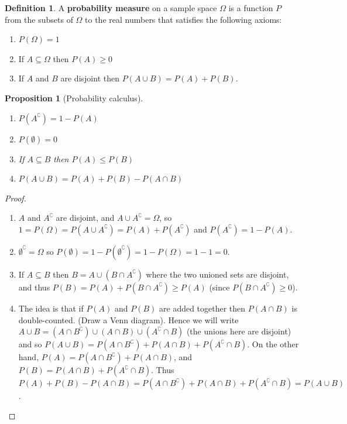 \documentclass[a4paper,leqno]{article}
\numberwithin{equation}{section}
\newtheorem{prp}[equation]{Proposition}
\theoremstyle{definition}
\newtheorem{defn}[equation]{Definition}
\theoremstyle{remark}
\newcommand{\df}{\textbf}
\newcommand{\union}{\cup}
\newcommand{\inter}{\cap}
\begin{document}
\begin{defn}\label{df:probmeasure}
  A \df{probability measure} on a sample space $ \Omega $ is a function $ P $ from the subsets of $ \Omega $ to the real numbers
  that satisfies the following axioms:
  \begin{enumerate}
    \item $ P(\Omega) = 1 $
    \item If $ A \subseteq \Omega $ then $ P(A) \geq 0 $
    \item If $ A $ and $ B $ are disjoint then $ P(A \union B) = P(A) + P(B) $.
  \end{enumerate}
\end{defn}

\begin{prp}[Probability calculus]\label{prp:probcalc}\leavevmode
  \begin{enumerate}
    \item $ P(A^\complement) = 1 - P(A) $
    \item $ P(\emptyset) = 0 $
    \item If $ A \subseteq B $ then $ P(A) \leq P(B) $
    \item $ P(A \union B) = P(A) + P(B) - P(A \inter B) $
  \end{enumerate}
\end{prp}
\begin{proof}\leavevmode
  \begin{enumerate}
    \item $ A $ and $ A^{\complement} $ are disjoint, and $ A \union A^{\complement} = \Omega $,
          so $ 1 = P(\Omega) = P(A \union A^{\complement}) = P(A) + P(A^{\complement}) $ and $ P(A^\complement) = 1 - P(A) $.
    \item $ \emptyset^\complement = \Omega $ so $ P(\emptyset) = 1 - P(\emptyset^\complement) = 1 - P(\Omega) = 1 - 1 = 0 $.
    \item If $ A \subseteq B $ then $ B = A \union (B \inter A^\complement) $ where the two unioned sets are disjoint, and
          thus $ P(B) = P(A) + P(B \inter A^\complement) \geq P(A) $ (since $ P(B \inter A^\complement) \geq 0 $).
    \item The idea is that if $ P(A) $ and $ P(B) $ are added together then $ P(A\inter B) $ is double-counted. (Draw a Venn diagram).
          Hence we will write $ A \union B = (A \inter B^\complement) \union (A \inter B) \union (A^\complement \inter B) $ (the unions
          here are disjoint) and so $ P(A \union B) = P(A \inter B^\complement) + P(A \inter B) + P(A^\complement \inter B) $. On the
          other hand, $ P(A) = P(A \inter B^\complement) + P(A \inter B) $, and $ P(B) = P(A \inter B) + P(A^\complement \inter B) $.
          Thus $ P(A) + P(B) - P(A \inter B) = P(A \inter B^\complement) + P(A \inter B) + P(A^\complement \inter B) = P(A \union B) $.
  \end{enumerate}
\end{proof}
\end{document}
